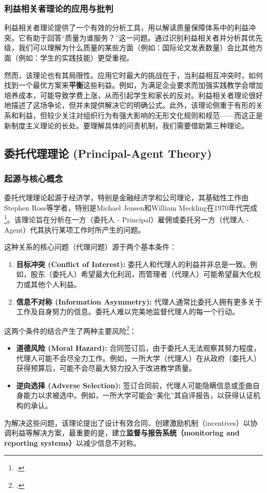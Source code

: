\subsubsection{利益相关者理论的应用与批判}

利益相关者理论提供了一个有效的分析工具，用以解读质量保障体系中的利益冲突。它有助于回答“质量为谁服务？”这一问题。通过识别利益相关者并分析其优先级，我们可以理解为什么质量的某些方面（例如：国际论文发表数量）会比其他方面（例如：学生的实践技能）更受重视。

然而，该理论也有其局限性。应用它时最大的挑战在于，当利益相互冲突时，如何找到一个最优方案来\textbf{平衡}这些利益。例如，为满足企业要求而加强实践教学会增加培养成本，可能导致学费上涨，从而引起学生和家长的反对。利益相关者理论很好地描述了这场争论，但并未提供解决它的明确公式。此外，该理论侧重于有形的关系和利益，但较少关注对组织行为有强大影响的无形文化规则和规范——而这正是新制度主义理论的长处。要理解具体的问责机制，我们需要借助第三种理论。

\subsection{委托代理理论 (Principal-Agent Theory)}
\label{subsec:uy_nhiem_nen_tang}

\subsubsection{起源与核心概念}
委托代理理论起源于经济学，特别是金融经济学和公司理论，其基础性工作由Stephen Ross等学者，特别是Michael Jensen和William Meckling在1970年代完成\footcite{JensenMeckling1976}。该理论旨在分析在一方（委托人 - Principal）雇佣或委托另一方（代理人 - Agent）代其执行某项工作时所产生的问题。

这种关系的核心问题（代理问题）源于两个基本条件：
\begin{enumerate}
    \item \textbf{目标冲突 (Conflict of Interest):} 委托人和代理人的利益并非总是一致。例如，股东（委托人）希望最大化利润，而管理者（代理人）可能希望最大化权力或其他个人利益。
    \item \textbf{信息不对称 (Information Asymmetry):} 代理人通常比委托人拥有更多关于工作及自身努力的信息。委托人难以完美地监督代理人的每一个行动。
\end{enumerate}
这两个条件的结合产生了两种主要风险\footcite{Eisenhardt1989}：
\begin{itemize}
    \item \textbf{道德风险 (Moral Hazard):} 合同签订后，由于委托人无法观察其努力程度，代理人可能不会尽全力工作。例如，一所大学（代理人）在从政府（委托人）获得预算后，可能不会尽最大努力投入于改进教学质量。
    \item \textbf{逆向选择 (Adverse Selection):} 签订合同前，代理人可能隐瞒信息或歪曲自身能力以求被选中。例如，一所大学可能会“美化”其自评报告，以获得认证机构的承认。
\end{itemize}
为解决这些问题，该理论提出了设计有效合同、创建激励机制（incentives）以协调利益等解决方案，最重要的是，建立\textbf{监督与报告系统（monitoring and reporting systems）}以减少信息不对称。


